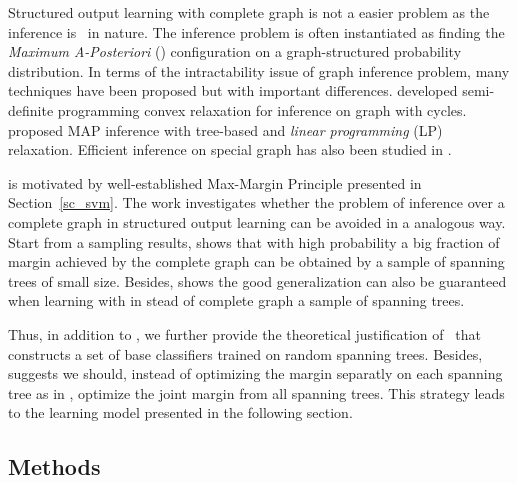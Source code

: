 {Structured output learning with complete graph is not a easier problem as the inference is \nphard\ in nature.
The inference problem is often instantiated as finding the \textit{Maximum A-Posteriori} (\map) configuration on a graph-structured probability distribution.
In terms of the intractability issue of graph inference problem, many techniques have been proposed but with important differences.
\citet{Jordan04semiefinite} developed semi-definite programming convex relaxation for inference on graph with cycles.
\citet{Wainwright05map} proposed MAP inference with tree-based and \textit{linear programming} (LP) relaxation.
Efficient inference on special graph has also been studied in \citep{Globerson07approximate}.

 is motivated by well-established Max-Margin Principle presented in Section~\ref{sc_svm}.
The work investigates whether the problem of inference over a complete graph in structured output learning can be avoided in a analogous way.
Start from a sampling results,  shows that with high probability a big fraction of margin achieved by the complete graph can be obtained by a sample of spanning trees of small size.
Besides,  shows the good generalization can also be guaranteed when learning with in stead of complete graph a sample of spanning trees.

Thus, in addition to , we further provide the theoretical justification of \mam\ that constructs a set of base classifiers trained on random spanning trees. 
Besides,  suggests we should, instead of optimizing the margin separatly on each spanning tree as in \mam, optimize the joint margin from all spanning trees.
This strategy leads to the learning model presented in the following section.

\subsection{Methods}

}

